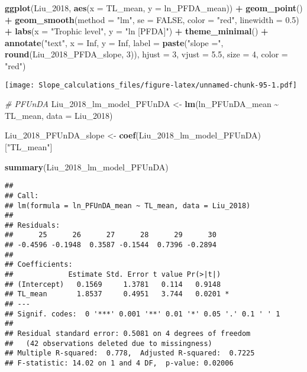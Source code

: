 \documentclass[
]{article}
\newenvironment{Shaded}{\begin{snugshade}}{\end{snugshade}}
\newcommand{\AttributeTok}[1]{\textcolor[rgb]{0.13,0.29,0.53}{#1}}
\newcommand{\CommentTok}[1]{\textcolor[rgb]{0.56,0.35,0.01}{\textit{#1}}}
\newcommand{\ConstantTok}[1]{\textcolor[rgb]{0.56,0.35,0.01}{#1}}
\newcommand{\DecValTok}[1]{\textcolor[rgb]{0.00,0.00,0.81}{#1}}
\newcommand{\FloatTok}[1]{\textcolor[rgb]{0.00,0.00,0.81}{#1}}
\newcommand{\FunctionTok}[1]{\textcolor[rgb]{0.13,0.29,0.53}{\textbf{#1}}}
\newcommand{\NormalTok}[1]{#1}
\newcommand{\OtherTok}[1]{\textcolor[rgb]{0.56,0.35,0.01}{#1}}
\newcommand{\SpecialCharTok}[1]{\textcolor[rgb]{0.81,0.36,0.00}{\textbf{#1}}}
\newcommand{\StringTok}[1]{\textcolor[rgb]{0.31,0.60,0.02}{#1}}
\begin{document}
\begin{Shaded}
\begin{Highlighting}[]
\FunctionTok{ggplot}\NormalTok{(Liu\_2018, }\FunctionTok{aes}\NormalTok{(}\AttributeTok{x =}\NormalTok{ TL\_mean, }\AttributeTok{y =}\NormalTok{ ln\_PFDA\_mean)) }\SpecialCharTok{+}
  \FunctionTok{geom\_point}\NormalTok{() }\SpecialCharTok{+}
  \FunctionTok{geom\_smooth}\NormalTok{(}\AttributeTok{method =} \StringTok{"lm"}\NormalTok{, }\AttributeTok{se =} \ConstantTok{FALSE}\NormalTok{, }\AttributeTok{color =} \StringTok{"red"}\NormalTok{, }\AttributeTok{linewidth =} \FloatTok{0.5}\NormalTok{) }\SpecialCharTok{+}
  \FunctionTok{labs}\NormalTok{(}\AttributeTok{x =} \StringTok{"Trophic level"}\NormalTok{,}
       \AttributeTok{y =} \StringTok{"ln [PFDA]"}\NormalTok{) }\SpecialCharTok{+}
  \FunctionTok{theme\_minimal}\NormalTok{() }\SpecialCharTok{+}
  \FunctionTok{annotate}\NormalTok{(}\StringTok{"text"}\NormalTok{, }\AttributeTok{x =} \ConstantTok{Inf}\NormalTok{, }\AttributeTok{y =} \ConstantTok{Inf}\NormalTok{, }\AttributeTok{label =} \FunctionTok{paste}\NormalTok{(}\StringTok{"slope ="}\NormalTok{, }\FunctionTok{round}\NormalTok{(Liu\_2018\_PFDA\_slope, }\DecValTok{3}\NormalTok{)), }
           \AttributeTok{hjust =} \DecValTok{3}\NormalTok{, }\AttributeTok{vjust =} \FloatTok{5.5}\NormalTok{, }\AttributeTok{size =} \DecValTok{4}\NormalTok{, }\AttributeTok{color =} \StringTok{"red"}\NormalTok{)}
\end{Highlighting}
\end{Shaded}

\texttt{[image: Slope\_calculations\_files/figure-latex/unnamed-chunk-95-1.pdf]}

\begin{Shaded}
\begin{Highlighting}[]
\CommentTok{\# PFUnDA}
\NormalTok{Liu\_2018\_lm\_model\_PFUnDA }\OtherTok{\textless{}{-}} \FunctionTok{lm}\NormalTok{(ln\_PFUnDA\_mean }\SpecialCharTok{\textasciitilde{}}\NormalTok{ TL\_mean,}
                             \AttributeTok{data =}\NormalTok{ Liu\_2018)}

\NormalTok{Liu\_2018\_PFUnDA\_slope }\OtherTok{\textless{}{-}} \FunctionTok{coef}\NormalTok{(Liu\_2018\_lm\_model\_PFUnDA)[}\StringTok{"TL\_mean"}\NormalTok{]}

\FunctionTok{summary}\NormalTok{(Liu\_2018\_lm\_model\_PFUnDA)}
\end{Highlighting}
\end{Shaded}

\begin{verbatim}
## 
## Call:
## lm(formula = ln_PFUnDA_mean ~ TL_mean, data = Liu_2018)
## 
## Residuals:
##      25      26      27      28      29      30 
## -0.4596 -0.1948  0.3587 -0.1544  0.7396 -0.2894 
## 
## Coefficients:
##             Estimate Std. Error t value Pr(>|t|)  
## (Intercept)   0.1569     1.3781   0.114   0.9148  
## TL_mean       1.8537     0.4951   3.744   0.0201 *
## ---
## Signif. codes:  0 '***' 0.001 '**' 0.01 '*' 0.05 '.' 0.1 ' ' 1
## 
## Residual standard error: 0.5081 on 4 degrees of freedom
##   (42 observations deleted due to missingness)
## Multiple R-squared:  0.778,  Adjusted R-squared:  0.7225 
## F-statistic: 14.02 on 1 and 4 DF,  p-value: 0.02006
\end{verbatim}
\end{document}
